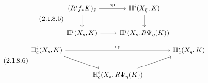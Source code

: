 \begin{equation}\tag{2.1.8.5}
\begin{tikzcd}
(R^i f_* K)_{\bar{s}} \arrow[r, "\mathrm{sp}"] \arrow[d] & \mathbb{H}^i(X_{\bar{\eta}}, K) \arrow[d] \\
\mathbb{H}^i(X_{\bar{s}}, K) \arrow[r] & \mathbb{H}^i(X_{\bar{s}}, R\Psi_{\bar{\eta}}(K))
\end{tikzcd}
\end{equation}
\begin{equation}\tag{2.1.8.6}
\begin{tikzcd}[column sep=large]
\mathbb{H}^i_c(X_{\bar{s}},K) \arrow[rr, "\mathrm{sp}"] \arrow[dr] & {} & \mathbb{H}^i_c(X_{\bar{\eta}}, K) \\
{} & \mathbb{H}^i_c(X_{\bar{s}}, R\Psi_{\bar{\eta}}(K)) \arrow[ur] &
{} \end{tikzcd}
\end{equation}
